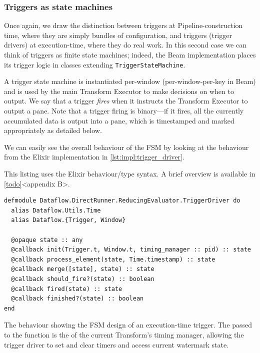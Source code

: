\subsubsection{Triggers as state machines}
Once again, we draw the distinction between triggers at Pipeline-construction time, where they are simply bundles of configuration, and triggers (trigger drivers) at execution-time, where they do real work.
In this second case we can think of triggers as finite state machines; indeed, the Beam implementation places its trigger logic in classes extending \verb|TriggerStateMachine|.

A trigger state machine is instantiated per-window (per-window-per-key in Beam) and is used by the main Transform Executor to make decisions on when to output.
We say that a trigger \emph{fires} when it instructs the Transform Executor to output a pane.
Note that a trigger firing is binary---if it fires, all the currently accumulated data is output into a pane, which is timestamped and marked appropriately as detailed below.

We can easily see the overall behaviour of the FSM by looking at the  behaviour from the Elixir implementation in \cref{lst:impl:trigger_driver}.\footnotemark

\footnotetext
{
This listing uses the Elixir behaviour/type syntax. A brief overview is available in \cref{todo}<appendix B>.
}

\begin{listing}[h]
	\begin{verbatim}
defmodule Dataflow.DirectRunner.ReducingEvaluator.TriggerDriver do
  alias Dataflow.Utils.Time
  alias Dataflow.{Trigger, Window}
  
  @opaque state :: any
  @callback init(Trigger.t, Window.t, timing_manager :: pid) :: state
  @callback process_element(state, Time.timestamp) :: state
  @callback merge([state], state) :: state
  @callback should_fire?(state) :: boolean
  @callback fired(state) :: state
  @callback finished?(state) :: boolean
end
	\end{verbatim}
\caption[The  behaviour showing the FSM design of an execution-time trigger.]{The  behaviour showing the FSM design of an execution-time trigger. The  passed to the  function is the  of the current Transform's timing manager, allowing the trigger driver to set and clear timers and access current watermark state.}
\label{lst:impl:trigger_driver}
\end{listing}


